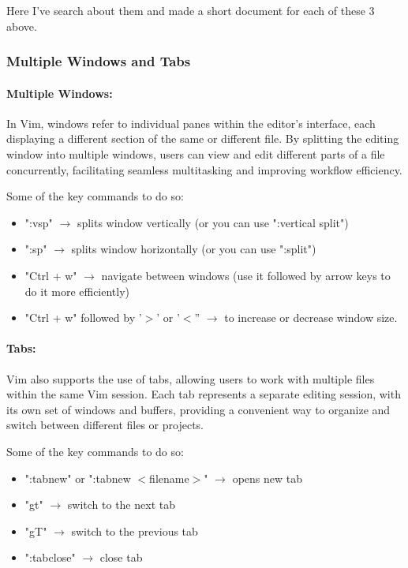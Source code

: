 \documentclass{article}
\begin{document}
	Here I've search about them and made a short document for each of these 3 above.

	\subsubsection{Multiple Windows and Tabs}
	\paragraph{Multiple Windows:} In Vim, windows refer to individual panes within the editor's interface, each displaying a different section of the same or different file.
	By splitting the editing window into multiple windows, users can view and edit different parts of a file concurrently, facilitating seamless multitasking and improving workflow efficiency.

	Some of the key commands to do so:
	\begin{itemize}
		\item ":vsp" $\rightarrow$ splits window vertically (or you can use ":vertical split")
		\item ":sp" $\rightarrow$ splits window horizontally (or you can use ":split")
		\item "Ctrl + w" $\rightarrow$ navigate between windows (use it followed by arrow keys to do it more efficiently)
		\item "Ctrl + w" followed by '$>$' or '$<$'' $\rightarrow$ to increase or decrease window size.
	\end{itemize}

	\paragraph{Tabs:} Vim also supports the use of tabs, allowing users to work with multiple files within the same Vim session.
	Each tab represents a separate editing session, with its own set of windows and buffers, providing a convenient way to organize and
	switch between different files or projects.

	Some of the key commands to do so:
	\begin{itemize}
		\item ":tabnew" or ":tabnew $<$filename$>$" $\rightarrow$ opens new tab
		\item "gt" $\rightarrow$ switch to the next tab
		\item "gT" $\rightarrow$ switch to the previous tab
		\item ":tabclose" $\rightarrow$ close tab
	\end{itemize}
\end{document}
